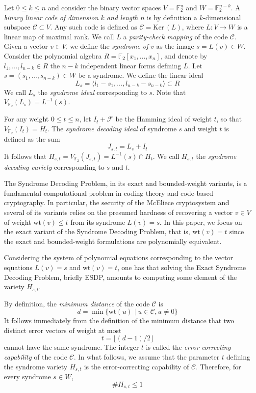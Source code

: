 \documentclass{amsart}
\def\FF{{\mathbb F}}
\def\Ker{{\mathrm{Ker\,}}}
\def\wt{{\mathrm{wt}}}
\def\cF{{\mathcal{F}}}
\def\cC{{\mathcal{C}}}
\begin{document}
Let $0\leq k\leq n$ and consider the binary vector spaces $V = \FF_2^n$ and $W = \FF_2^{n-k}$.
A {\em binary linear code of dimension $k$ and length $n$} is by definition a $k$-dimensional
subspace $\cC\subset V$. Any such code is defined as $\cC = \Ker(L)$, where $L:V\to W$ is a linear
map of maximal rank. We call $L$ a {\em parity-check mapping} of the code $\cC$. Given a vector
$v\in V$, we define the {\em syndrome of $v$} as the image $s = L(v)\in W$.
Consider the polynomial algebra $R = \FF_2[x_1,\ldots,x_n]$, and denote by
$l_1,\ldots,l_{n-k}\in R$ the $n-k$ independent linear forms defining $L$.
Let $s = (s_1,\ldots,s_{n-k})\in W$ be a syndrome. We define the linear ideal
\[
L_s = \langle l_1 - s_1, \ldots, l_{n-k} - s_{n-k} \rangle\subset R 
\]
We call $L_s$ the {\em syndrome ideal} corresponding to $s$. Note that $V_{\FF_2}(L_s) = L^{-1}(s)$.

For any weight $0\leq t\leq n$, let $I_t + \cF$ be the Hamming ideal of weight $t$, so that
$V_{\FF_2}(I_t) = H_t$. The {\em syndrome decoding ideal} of syndrome $s$ and weight $t$
is defined as the sum
\[
J_{s,t} = L_s + I_t
\]
It follows that $H_{s,t} = V_{\FF_2}(J_{s,t}) = L^{-1}(s)\cap H_t$. We call $H_{s,t}$ the
{\em syndrome decoding variety} corresponding to $s$ and $t$.

The Syndrome Decoding Problem, in its exact and bounded-weight variants, is a fundamental computational
problem in coding theory and code-based cryptography. In particular, the security of the McEliece
cryptosystem and several of its variants relies on the presumed hardness of recovering a vector $v\in V$
of weight $\wt(v)\leq t$ from its syndrome $L(v) = s$. In this paper, we focus on the exact variant
of the Syndrome Decoding Problem, that is, $\wt(v) =  t$ since the exact and bounded-weight formulations
are polynomially equivalent.

Considering the system of polynomial equations corresponding to the vector equations $L(v) = s$
and $\wt(v) =  t$, one has that solving the Exact Syndrome Decoding Problem, briefly ESDP,
amounts to computing some element of the variety $H_{s,t}$.

By definition, the {\em minimum distance} of the code $\cC$ is
\[
d = \min\{\wt(u) \mid u \in \cC, u \neq 0\}
\]
It follows immediately from the definition of the minimum distance that two
distinct error vectors of weight at most
\[
t = \lfloor (d-1)/2 \rfloor
\]
cannot have the same syndrome. The integer $t$ is called the {\em error-correcting
capability} of the code $\cC$. In what follows, we assume that the parameter $t$
defining the syndrome variety $H_{s,t}$ is the error-correcting capability of $\cC$.
Therefore, for every syndrome $s\in W$,
\[
\# H_{s,t}\leq 1
\]
\end{document}
